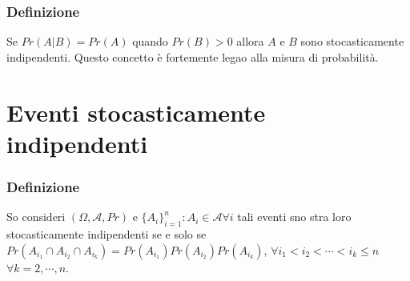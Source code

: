 \subsubsection{Definizione}
Se $Pr(A|B)=Pr(A)$ quando $Pr(B)>0$ allora $A$ e $B$ sono stocasticamente indipendenti. Questo concetto \`e fortemente legao alla misura di probabilit\`a.
\section{Eventi stocasticamente indipendenti}
\subsubsection{Definizione}
So consideri $(\Omega,\mathcal{A},Pr)$ e $\{A_i\}_{i=1}^n:A_i\in \mathcal{A}\forall i$ tali eventi sno stra loro stocasticamente indipendenti se e solo se $Pr(A_{i_1}\cap A_{i_2}\cap
A_{i_k})=Pr(A_{i_1})Pr(A_{i_2})Pr(A_{i_k})$, $\forall i_1<i_2<\cdots<i_k\le n$ $\forall k=2,\cdots, n$.
